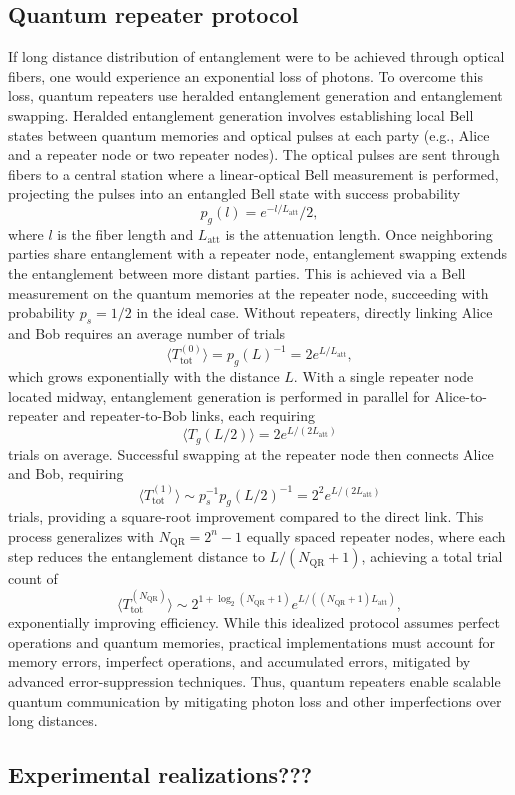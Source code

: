 \subsection{Quantum repeater protocol}
If long distance distribution of entanglement were to be achieved through optical fibers, one would experience an exponential loss of photons.
 To overcome this loss, quantum repeaters use heralded entanglement generation and entanglement swapping.
 Heralded entanglement generation involves establishing
 local Bell states between quantum memories and optical pulses at each party (e.g., Alice and a repeater node or two repeater nodes).
 The optical pulses are sent through fibers to a central station where a linear-optical Bell measurement is performed,
 projecting the pulses into an entangled Bell state with success probability 
 \begin{equation}
    p_g(l) = e^{-l/L_{\text{att}}}/2,
 \end{equation}
 where $l$ is the fiber length and $L_{\text{att}}$ is the attenuation length.
 Once neighboring parties share entanglement with a repeater node, entanglement swapping extends the entanglement between more distant parties.
 This is achieved via a Bell measurement on the quantum memories at the repeater node, succeeding with probability $p_s = 1/2$ in the ideal case.
 Without repeaters, directly linking Alice and Bob requires an average number of trials 
 \begin{equation}
    \langle T^{(0)}_{\text{tot}} \rangle = p_g(L)^{-1} = 2e^{L/L_{\text{att}}},
 \end{equation}
 which grows exponentially with the distance $L$. With a single repeater node located midway, entanglement generation is performed in parallel for Alice-to-repeater and repeater-to-Bob links,
 each requiring 
 \begin{equation}
    \langle T_g(L/2) \rangle = 2e^{L/(2L_{\text{att}})}
 \end{equation}
 trials on average. Successful swapping at the repeater node then connects Alice and Bob,
 requiring 
 \begin{equation}
    \langle T^{(1)}_{\text{tot}} \rangle \sim p_s^{-1} p_g(L/2)^{-1} = 2^2 e^{L/(2L_{\text{att}})}
 \end{equation}
 trials, providing a square-root improvement compared to the direct link.
 This process generalizes with $N_{\text{QR}} = 2^n - 1$ equally spaced repeater nodes, where each step reduces the entanglement distance to $L/(N_{\text{QR}} + 1)$,
 achieving a total trial count of
 \begin{equation}
    \langle T^{(N_{\text{QR}})}_{\text{tot}} \rangle \sim 2^{1+\log_2(N_{\text{QR}} + 1)} e^{L/((N_{\text{QR}} + 1)L_{\text{att}})},
 \end{equation}
 exponentially improving efficiency. While this idealized protocol assumes perfect operations and quantum memories, practical implementations must account for memory errors,
 imperfect operations, and accumulated errors, mitigated by advanced error-suppression techniques. Thus,
 quantum repeaters enable scalable quantum communication by mitigating photon loss and other imperfections over long distances.


\subsection{Experimental realizations???}